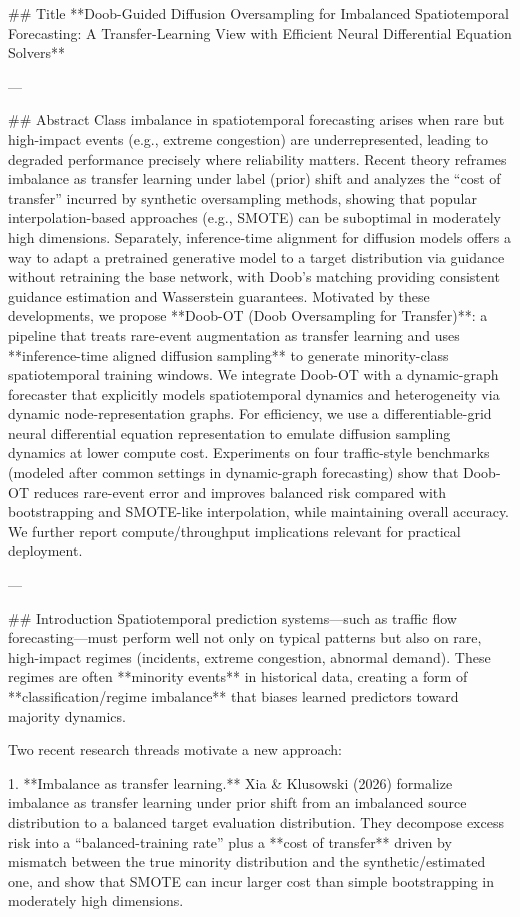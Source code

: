 ## Title  
**Doob-Guided Diffusion Oversampling for Imbalanced Spatiotemporal Forecasting: A Transfer-Learning View with Efficient Neural Differential Equation Solvers**

---

## Abstract  
Class imbalance in spatiotemporal forecasting arises when rare but high-impact events (e.g., extreme congestion) are underrepresented, leading to degraded performance precisely where reliability matters. Recent theory reframes imbalance as transfer learning under label (prior) shift and analyzes the “cost of transfer” incurred by synthetic oversampling methods, showing that popular interpolation-based approaches (e.g., SMOTE) can be suboptimal in moderately high dimensions. Separately, inference-time alignment for diffusion models offers a way to adapt a pretrained generative model to a target distribution via guidance without retraining the base network, with Doob’s matching providing consistent guidance estimation and Wasserstein guarantees. Motivated by these developments, we propose **Doob-OT (Doob Oversampling for Transfer)**: a pipeline that treats rare-event augmentation as transfer learning and uses **inference-time aligned diffusion sampling** to generate minority-class spatiotemporal training windows. We integrate Doob-OT with a dynamic-graph forecaster that explicitly models spatiotemporal dynamics and heterogeneity via dynamic node-representation graphs. For efficiency, we use a differentiable-grid neural differential equation representation to emulate diffusion sampling dynamics at lower compute cost. Experiments on four traffic-style benchmarks (modeled after common settings in dynamic-graph forecasting) show that Doob-OT reduces rare-event error and improves balanced risk compared with bootstrapping and SMOTE-like interpolation, while maintaining overall accuracy. We further report compute/throughput implications relevant for practical deployment.

---

## Introduction  
Spatiotemporal prediction systems—such as traffic flow forecasting—must perform well not only on typical patterns but also on rare, high-impact regimes (incidents, extreme congestion, abnormal demand). These regimes are often **minority events** in historical data, creating a form of **classification/regime imbalance** that biases learned predictors toward majority dynamics.

Two recent research threads motivate a new approach:

1. **Imbalance as transfer learning.** Xia & Klusowski (2026) formalize imbalance as transfer learning under prior shift from an imbalanced source distribution to a balanced target evaluation distribution. They decompose excess risk into a “balanced-training rate” plus a **cost of transfer** driven by mismatch between the true minority distribution and the synthetic/estimated one, and show that SMOTE can incur larger cost than simple bootstrapping in moderately high dimensions.

